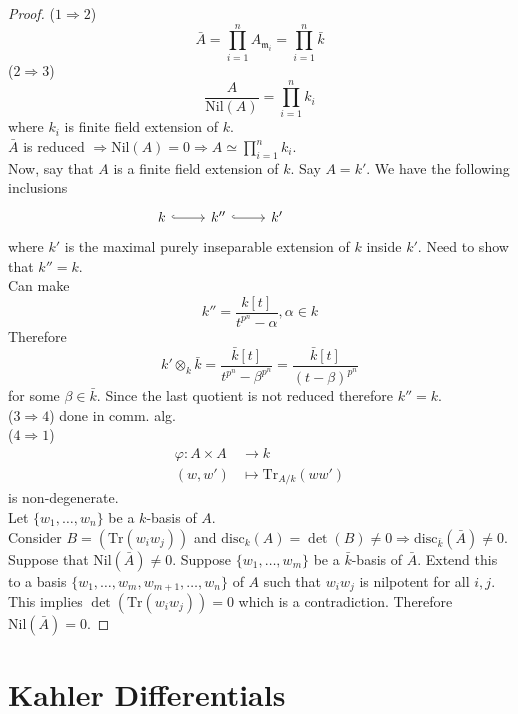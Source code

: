\documentclass[oneside, 12pt, ]{scrbook}
\newcommand{\m}{\mathfrak{m}}
\newcommand{\nil}{\mathrm{Nil}}
\newcommand{\ds}{\displaystyle}
\theoremstyle{theorem}
\begin{document}
\begin{proof}
($1 \Rightarrow 2$)
$$ \bar{A} = \prod_{i=1}^{n} A_{\m_{i}} = \prod_{i=1}^n \bar{k}$$
($2 \Rightarrow 3$) 
$$\frac{A}{\mathrm{Nil}(A)} = \prod_{i=1}^{n} k_{i}$$ where $k_{i}$ is finite field extension of $k$. \\
$\bar{A}$ is reduced $\Rightarrow \nil(A)=0 \Rightarrow A \simeq \ds{\prod_{i=1}^n k_{i}}$. \\
Now, say that $A$ is a finite field extension of $k$. Say $A = k'$. We have the following inclusions \[\begin{tikzcd}
	k & {k''} & {k'} && {}
	\arrow[hook, from=1-1, to=1-2]
	\arrow[hook, from=1-2, to=1-3]
\end{tikzcd}\]
where $k'$ is the maximal purely inseparable extension of $k$ inside $k'$. Need to show that $k'' = k$. \\
Can make $$k '' = \frac{k[t]}{t^{p^n} - \alpha} , \alpha \in k$$
Therefore $$k ' \otimes_{k} \bar{k} = \frac{\bar{k}[t]}{t^{p^n} - \beta^{p^{n}}} = \frac{\bar{k}[t]}{(t-\beta)^{p^n}}$$ for some $\beta\in \bar{k}$. Since the last quotient is not reduced therefore $k'' =k$.\\

($3 \Rightarrow 4$) done in comm. alg. \\

($4 \Rightarrow 1$)
\begin{align*}
\varphi : A\times A &\rightarrow k \\
(w,w') &\mapsto \mathrm{Tr}_{A/k}(ww')
\end{align*}
is non-degenerate. \\
Let $\{w_{1}, \hdots , w_{n}\}$ be a $k$-basis of $A$. \\
Consider $B = (\mathrm{Tr}(w_{i}w_{j}))$ and $\mathrm{disc}_{k}(A) = \det(B) \neq 0 \Rightarrow \mathrm{disc}_{\bar{k}}(\bar{A}) \neq 0$. \\
Suppose that $\nil(\bar{A}) \neq 0$. Suppose $\{w_{1}, \hdots , w_{m}\}$ be a $\bar{k}$-basis of $\bar{A}$. Extend this to a basis $\{w_{1}, \hdots , w_{m}, w_{m+1}, \hdots , w_{n}\}$ of $A$ such that $w_{i}w_{j}$ is nilpotent for all $i,j$. This implies $\det(\mathrm{Tr}(w_{i}w_{j})) = 0$ which is a contradiction. Therefore $\nil(\bar{A})=0$.
\end{proof}

\section{Kahler Differentials}
\end{document}

